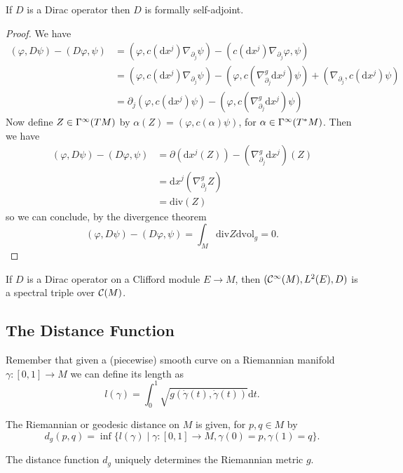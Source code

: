 \begin{proposition}
 If $D$ is a Dirac operator then $D$ is formally self-adjoint.
\end{proposition}
\begin{proof}
 We have \begin{align*}
          (\varphi,D\psi)-(D\varphi,\psi)&=(\varphi,c(\mathrm{d}x^j)\nabla_{\partial_j}\psi)-(c(\mathrm{d}x^j)\nabla_{\partial_j}\varphi,\psi) \\ &=(\varphi,c(\mathrm{d}x^j)\nabla_{\partial_j}\psi)-(\varphi,c(\nabla^g_{\partial_j}\mathrm{d}x^j)\psi)+(\nabla_{\partial_j},c(\mathrm{d}x^j)\psi)\\
          &=\partial_j(\varphi,c(\mathrm{d}x^j)\psi)-(\varphi,c(\nabla^g_{\partial_j}\mathrm{d}x^j)\psi)
         \end{align*}
Now define $Z\in\Gamma^\infty(TM)$ by $\alpha(Z)=(\varphi,c(\alpha)\psi)$, for $\alpha\in\Gamma^\infty(T^\ast M)$. Then we have 
\begin{align*}
 (\varphi,D\psi)-(D\varphi,\psi)&=\partial(\mathrm{d}x^j(Z))-(\nabla^g_{\partial_j}\mathrm{d}x^j)(Z)\\
 &=\mathrm{d}x^j(\nabla^g_{\partial_j}Z)\\
 &=\mathrm{div}(Z)
\end{align*}
so we can conclude, by the divergence theorem 
$$(\varphi,D\psi)-(D\varphi,\psi)=\int_M\mathrm{div} Z\mathrm{dvol}_g=0.$$
\end{proof}

\begin{corollary}
 If $D$ is a Dirac operator on a Clifford module $E\to M$, then $(\mathcal{C}^\infty(M),L^2(E),D)$ is a spectral triple over $\mathcal{C}(M)$.
\end{corollary}

\subsection{The Distance Function}
Remember that given a (piecewise) smooth curve on a Riemannian manifold $\gamma\colon[0,1]\to M$ we can define its length as $$l(\gamma)=\int_0^1\sqrt{g(\dot\gamma(t),\dot\gamma(t))}\mathrm{d}t.$$

\begin{definition}
 The Riemannian or geodesic distance on $M$ is given, for $p,q\in M$ by $$d_g(p,q)=\inf\{l(\gamma)\mid\gamma\colon[0,1]\to M,\gamma(0)=p,\gamma(1)=q\}.$$
\end{definition}

\begin{theorem}The distance function $d_g$ uniquely determines the Riemannian metric $g$.
\end{theorem}


